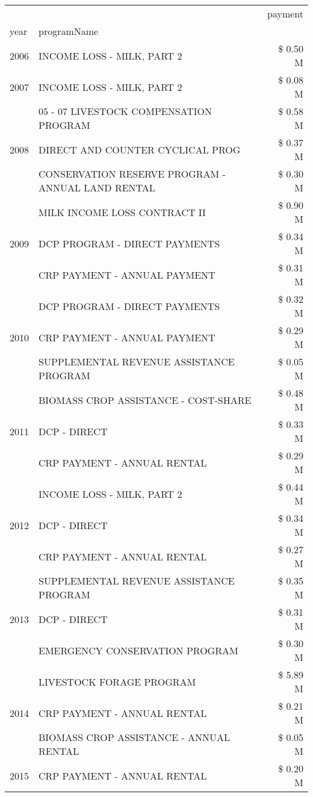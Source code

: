 \begin{tabular}{llr}
\toprule
 &  & payment \\
year & programName &  \\
\midrule
2006 & INCOME LOSS - MILK, PART 2 & \$ 0.50 M \\
\cline{1-3}
2007 & INCOME LOSS - MILK, PART 2 & \$ 0.08 M \\
\cline{1-3}
\multirow[t]{3}{*}{2008} & 05 - 07 LIVESTOCK COMPENSATION PROGRAM & \$ 0.58 M \\
 & DIRECT AND COUNTER CYCLICAL PROG & \$ 0.37 M \\
 & CONSERVATION RESERVE PROGRAM - ANNUAL LAND RENTAL & \$ 0.30 M \\
\cline{1-3}
\multirow[t]{3}{*}{2009} & MILK INCOME LOSS CONTRACT II & \$ 0.90 M \\
 & DCP PROGRAM - DIRECT PAYMENTS & \$ 0.34 M \\
 & CRP PAYMENT - ANNUAL PAYMENT & \$ 0.31 M \\
\cline{1-3}
\multirow[t]{3}{*}{2010} & DCP PROGRAM - DIRECT PAYMENTS & \$ 0.32 M \\
 & CRP PAYMENT - ANNUAL PAYMENT & \$ 0.29 M \\
 & SUPPLEMENTAL REVENUE ASSISTANCE PROGRAM & \$ 0.05 M \\
\cline{1-3}
\multirow[t]{3}{*}{2011} & BIOMASS CROP ASSISTANCE - COST-SHARE & \$ 0.48 M \\
 & DCP - DIRECT & \$ 0.33 M \\
 & CRP PAYMENT - ANNUAL RENTAL & \$ 0.29 M \\
\cline{1-3}
\multirow[t]{3}{*}{2012} & INCOME LOSS - MILK, PART 2 & \$ 0.44 M \\
 & DCP - DIRECT & \$ 0.34 M \\
 & CRP PAYMENT - ANNUAL RENTAL & \$ 0.27 M \\
\cline{1-3}
\multirow[t]{3}{*}{2013} & SUPPLEMENTAL REVENUE ASSISTANCE PROGRAM & \$ 0.35 M \\
 & DCP - DIRECT & \$ 0.31 M \\
 & EMERGENCY CONSERVATION PROGRAM & \$ 0.30 M \\
\cline{1-3}
\multirow[t]{3}{*}{2014} & LIVESTOCK FORAGE PROGRAM & \$ 5.89 M \\
 & CRP PAYMENT - ANNUAL RENTAL & \$ 0.21 M \\
 & BIOMASS CROP ASSISTANCE - ANNUAL RENTAL & \$ 0.05 M \\
\cline{1-3}
\multirow[t]{3}{*}{2015} & CRP PAYMENT - ANNUAL RENTAL & \$ 0.20 M \\

\end{tabular}
